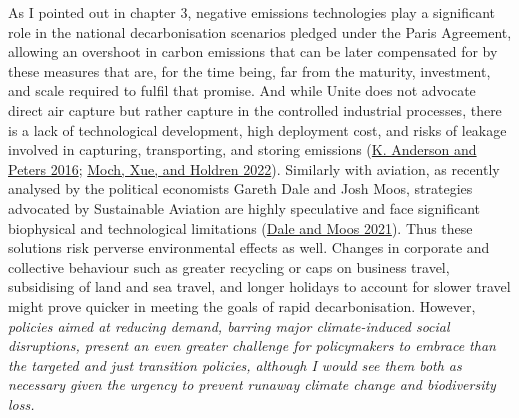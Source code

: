 \documentclass[a4paper, nobind]{templates/ociamthesis}
\begin{document}
As I pointed out in chapter 3, negative emissions technologies play a significant role in the national decarbonisation scenarios pledged under the Paris Agreement, allowing an overshoot in carbon emissions that can be later compensated for by these measures that are, for the time being, far from the maturity, investment, and scale required to fulfil that promise. And while Unite does not advocate direct air capture but rather capture in the controlled industrial processes, there is a lack of technological development, high deployment cost, and risks of leakage involved in capturing, transporting, and storing emissions (\protect\hyperlink{ref-anderson_trouble_2016}{K. Anderson and Peters 2016}; \protect\hyperlink{ref-moch_carbon_2022}{Moch, Xue, and Holdren 2022}). Similarly with aviation, as recently analysed by the political economists Gareth Dale and Josh Moos, strategies advocated by Sustainable Aviation are highly speculative and face significant biophysical and technological limitations (\protect\hyperlink{ref-dale_jet_2021}{Dale and Moos 2021}). Thus these solutions risk perverse environmental effects as well. Changes in corporate and collective behaviour such as greater recycling or caps on business travel, subsidising of land and sea travel, and longer holidays to account for slower travel might prove quicker in meeting the goals of rapid decarbonisation. However, \emph{policies aimed at reducing demand, barring major climate-induced social disruptions, present an even greater challenge for policymakers to embrace than the targeted and just transition policies, although I would see them both as necessary given the urgency to prevent runaway climate change and biodiversity loss.}
\end{document}
